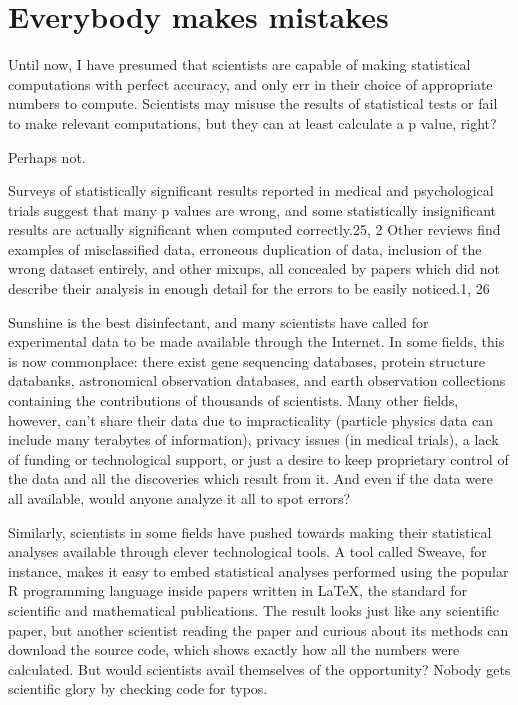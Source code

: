 \chapter{Everybody makes mistakes}
\label{chp9}

Until now, I have presumed that scientists are capable of making statistical computations with perfect accuracy, and only err in their choice of appropriate numbers to compute. Scientists may misuse the results of statistical tests or fail to make relevant computations, but they can at least calculate a p value, right?

Perhaps not.

Surveys of statistically significant results reported in medical and psychological trials suggest that many p values are wrong, and some statistically insignificant results are actually significant when computed correctly.25, 2 Other reviews find examples of misclassified data, erroneous duplication of data, inclusion of the wrong dataset entirely, and other mixups, all concealed by papers which did not describe their analysis in enough detail for the errors to be easily noticed.1, 26

Sunshine is the best disinfectant, and many scientists have called for experimental data to be made available through the Internet. In some fields, this is now commonplace: there exist gene sequencing databases, protein structure databanks, astronomical observation databases, and earth observation collections containing the contributions of thousands of scientists. Many other fields, however, can’t share their data due to impracticality (particle physics data can include many terabytes of information), privacy issues (in medical trials), a lack of funding or technological support, or just a desire to keep proprietary control of the data and all the discoveries which result from it. And even if the data were all available, would anyone analyze it all to spot errors?

Similarly, scientists in some fields have pushed towards making their statistical analyses available through clever technological tools. A tool called Sweave, for instance, makes it easy to embed statistical analyses performed using the popular R programming language inside papers written in LaTeX, the standard for scientific and mathematical publications. The result looks just like any scientific paper, but another scientist reading the paper and curious about its methods can download the source code, which shows exactly how all the numbers were calculated. But would scientists avail themselves of the opportunity? Nobody gets scientific glory by checking code for typos.

